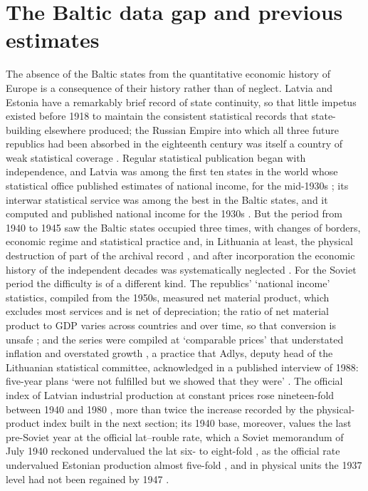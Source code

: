 \section{The Baltic data gap and previous estimates}
\label{sec:gap}

The absence of the Baltic states from the quantitative economic history of Europe is a consequence of their history rather than of neglect. Latvia and Estonia have a remarkably brief record of state continuity, so that little impetus existed before 1918 to maintain the consistent statistical records that state-building elsewhere produced; the Russian Empire into which all three future republics had been absorbed in the eighteenth century was itself a country of weak statistical coverage \parencite[219--20]{gregrussianempire}. Regular statistical publication began with independence, and Latvia was among the first ten states in the world whose statistical office published estimates of national income, for the mid-1930s \parencite{norkuslatvia1935}; its interwar statistical service was among the best in the Baltic states, and it computed and published national income for the 1930s \parencite[112]{norkusdvides}. But the period from 1940 to 1945 saw the Baltic states occupied three times, with changes of borders, economic regime and statistical practice and, in Lithuania at least, the physical destruction of part of the archival record \parencite[140]{dagys1959}, and after incorporation the economic history of the independent decades was systematically neglected \parencite[244]{morysivanovinterwarinmorys2021}. For the Soviet period the difficulty is of a different kind. The republics' `national income' statistics, compiled from the 1950s, measured net material product, which excludes most services and is net of depreciation; the ratio of net material product to GDP varies across countries and over time, so that conversion is unsafe \parencites[581--93]{ceska1989}{Campbell1985}; and the series were compiled at `comparable prices' that understated inflation and overstated growth \parencites[164--7]{mertelsmann_2003_there}[289]{years_of_dependence}, a practice that Adlys, deputy head of the Lithuanian statistical committee, acknowledged in a published interview of 1988: five-year plans `were not fulfilled but we showed that they were' \parencite{adlys1988}. The official index of Latvian industrial production at constant prices rose nineteen-fold between 1940 and 1980 \parencite[361]{years_of_dependence}, more than twice the increase recorded by the physical-product index built in the next section; its 1940 base, moreover, values the last pre-Soviet year at the official lat--rouble rate, which a Soviet memorandum of July 1940 reckoned undervalued the lat six- to eight-fold \parencite[290]{terleckaspinigai}, as the official rate undervalued Estonian production almost five-fold \parencite[167]{mertelsmann_2003_there}, and in physical units the 1937 level had not been regained by 1947 \parencite[109]{years_of_dependence}.

